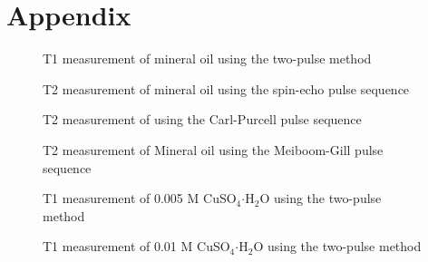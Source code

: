\documentclass[
reprint,
amsmath,amssymb,
aps,
tikz,
border=5pt
]{revtex4-1}
\begin{document}
\clearpage

{}

\clearpage


\onecolumngrid

\section*{Appendix}



  
\begin{figure}[h]
  \resizebox{0.75\textwidth}{!}{}
  \caption{T1 measurement of mineral oil using the two-pulse method }
  \label{figAp:mo_t1}
\end{figure}

\begin{figure}[h]
  \resizebox{0.75\textwidth}{!}{}
  \caption{T2 measurement of mineral oil using the spin-echo pulse sequence }
  \label{figAp:mo_se}
\end{figure}

\begin{figure}[h]
  \resizebox{0.75\textwidth}{!}{}
  \caption{T2 measurement of  using the Carl-Purcell pulse sequence }
  \label{figAp:mo_cp}
\end{figure}

\begin{figure}[h]
  \resizebox{0.75\textwidth}{!}{}
  \caption{T2 measurement of Mineral oil using the Meiboom-Gill pulse sequence }
  \label{figAp:mo_t2}
\end{figure}


\begin{figure}[h]
  \resizebox{0.75\textwidth}{!}{}
  \caption{T1 measurement of 0.005 M  CuSO$_{4} \boldsymbol{\cdot} $H$_2$O using the two-pulse method }
  \label{figAp:0d005_t1}
\end{figure}

\begin{figure}[h]
  \resizebox{0.75\textwidth}{!}{}
  \caption{T1 measurement of 0.01 M  CuSO$_{4} \boldsymbol{\cdot} $H$_2$O using the two-pulse method }
  \label{figAp:0d01_t1}
\end{figure}
\end{document}
